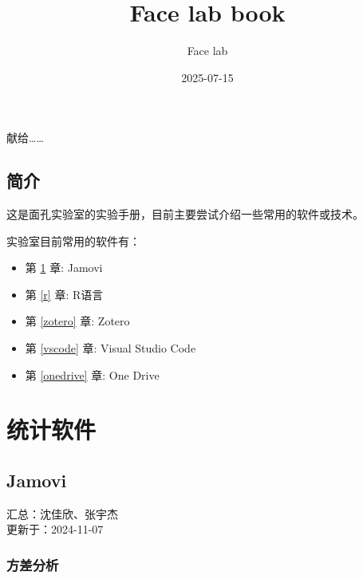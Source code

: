 \documentclass[]{ctexbook}
\title{Face lab book}
\author{Face lab}
\date{2025-07-15}
\providecommand{\tightlist}{%
  \setlength{\itemsep}{0pt}\setlength{\parskip}{0pt}}
\theoremstyle{definition}
\theoremstyle{definition}
\theoremstyle{definition}
\theoremstyle{definition}
\theoremstyle{remark}
\begin{document}
\maketitle


\thispagestyle{empty}

\begin{center}
献给……

\end{center}

\setlength{\abovedisplayskip}{-5pt}
\setlength{\abovedisplayshortskip}{-5pt}

{
\setcounter{tocdepth}{2}
\tableofcontents
}
\listoftables
\listoffigures
\chapter{简介}\label{ux7b80ux4ecb}

这是面孔实验室的实验手册，目前主要尝试介绍一些常用的软件或技术。

实验室目前常用的软件有：

\begin{itemize}
\tightlist
\item
  第 \ref{jamovi} 章: Jamovi\\
\item
  第 \ref{r} 章: R语言\\
\item
  第 \ref{zotero} 章: Zotero
\item
  第 \ref{vscode} 章: Visual Studio Code\\
\item
  第 \ref{onedrive} 章: One Drive
\end{itemize}

\mainmatter

\part{统计软件}\label{part-ux7edfux8ba1ux8f6fux4ef6}

\chapter{Jamovi}\label{jamovi}

汇总：沈佳欣、张宇杰\\
更新于：2024-11-07

\section{方差分析}\label{ux65b9ux5deeux5206ux6790}
\end{document}
